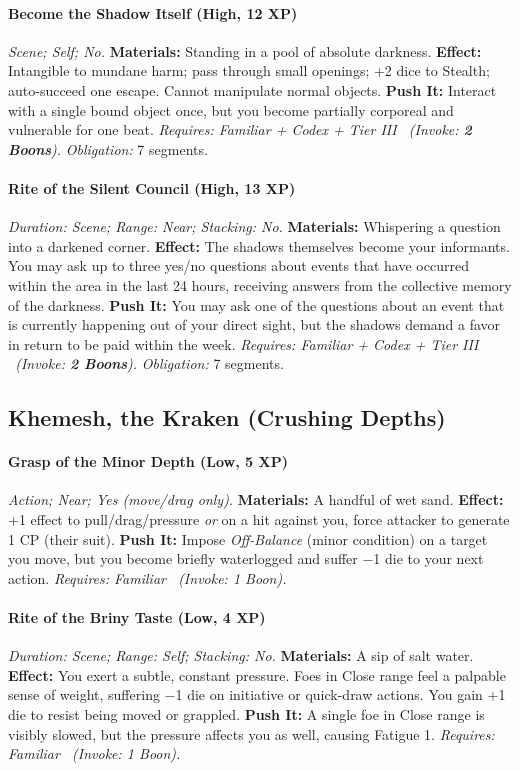 \documentclass[12pt,twoside]{book}
\begin{document}
\paragraph{Become the Shadow Itself (High, 12 XP)} \emph{Scene; Self; No.}
\textbf{Materials:} Standing in a pool of absolute darkness.
\textbf{Effect:} Intangible to mundane harm; pass through small openings; +2 dice to Stealth; auto-succeed one escape. Cannot manipulate normal objects.
\textbf{Push It:} Interact with a single bound object once, but you become partially corporeal and vulnerable for one beat.
\emph{Requires: Familiar + Codex + Tier III \ (\textit{Invoke:} \textbf{2 Boons}).}
\emph{Obligation:} 7 segments.

\paragraph{Rite of the Silent Council (High, 13 XP)} \emph{Duration: Scene; Range: Near; Stacking: No.}
\textbf{Materials:} Whispering a question into a darkened corner.
\textbf{Effect:} The shadows themselves become your informants. You may ask up to three yes/no questions about events that have occurred within the area in the last 24 hours, receiving answers from the collective memory of the darkness.
\textbf{Push It:} You may ask one of the questions about an event that is currently happening out of your direct sight, but the shadows demand a favor in return to be paid within the week.
\emph{Requires: Familiar + Codex + Tier III \ (\textit{Invoke:} \textbf{2 Boons}).}
\emph{Obligation:} 7 segments.

\subsection{Khemesh, the Kraken (Crushing Depths)}
\paragraph{Grasp of the Minor Depth (Low, 5 XP)} \emph{Action; Near; Yes (move/drag only).}
\textbf{Materials:} A handful of wet sand.
\textbf{Effect:} +1 effect to pull/drag/pressure \emph{or} on a hit against you, force attacker to generate 1 CP (their suit).
\textbf{Push It:} Impose \emph{Off-Balance} (minor condition) on a target you move, but you become briefly waterlogged and suffer −1 die to your next action.
\emph{Requires: Familiar \ (\textit{Invoke:} 1 Boon).}
\paragraph{Rite of the Briny Taste (Low, 4 XP)} \emph{Duration: Scene; Range: Self; Stacking: No.}
\textbf{Materials:} A sip of salt water.
\textbf{Effect:} You exert a subtle, constant pressure. Foes in Close range feel a palpable sense of weight, suffering −1 die on initiative or quick-draw actions. You gain +1 die to resist being moved or grappled.
\textbf{Push It:} A single foe in Close range is visibly slowed, but the pressure affects you as well, causing Fatigue 1.
\emph{Requires: Familiar \ (\textit{Invoke:} 1 Boon).}
\end{document}
